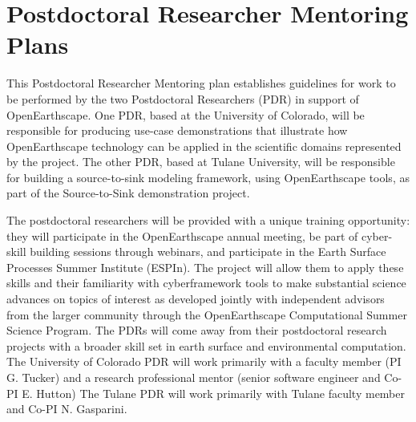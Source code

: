 \section*{Postdoctoral Researcher Mentoring Plans}


This Postdoctoral Researcher Mentoring plan establishes guidelines for work to be performed by the two Postdoctoral Researchers (PDR) in support of OpenEarthscape. One PDR, based at the University of Colorado, will be responsible for producing use-case demonstrations that illustrate how OpenEarthscape technology can be applied in the scientific domains represented by the project. The other PDR, based at Tulane University, will be responsible for building a source-to-sink modeling framework, using OpenEarthscape tools, as part of the Source-to-Sink demonstration project.


The postdoctoral researchers will be provided with a unique training opportunity: they will participate in the OpenEarthscape annual meeting, be part of cyber-skill building sessions through webinars, and participate in the Earth Surface Processes Summer Institute (ESPIn). The project will allow them to apply these skills and their familiarity with cyberframework tools to make substantial science advances on topics of interest as developed jointly with independent advisors from the larger community through the OpenEarthscape Computational Summer Science Program. The PDRs will come away from their postdoctoral research projects with a broader skill set in earth surface and environmental computation. The University of Colorado PDR will work primarily with a faculty member (PI G. Tucker) and a research professional mentor (senior software engineer and Co-PI E. Hutton)  The Tulane PDR will work primarily with Tulane faculty member and Co-PI N. Gasparini.

